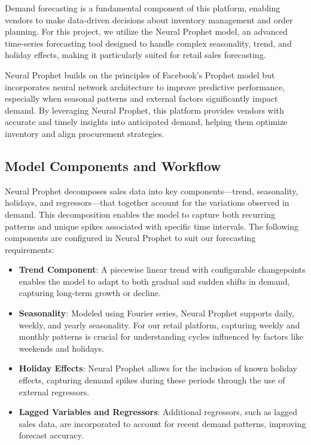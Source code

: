 Demand forecasting is a fundamental component of this platform, enabling vendors to make data-driven decisions about inventory management and order planning. For this project, we utilize the Neural Prophet model, an advanced time-series forecasting tool designed to handle complex seasonality, trend, and holiday effects, making it particularly suited for retail sales forecasting.

Neural Prophet builds on the principles of Facebook's Prophet model but incorporates neural network architecture to improve predictive performance, especially when seasonal patterns and external factors significantly impact demand. By leveraging Neural Prophet, this platform provides vendors with accurate and timely insights into anticipated demand, helping them optimize inventory and align procurement strategies.

\subsection{Model Components and Workflow}

Neural Prophet decomposes sales data into key components—trend, seasonality, holidays, and regressors—that together account for the variations observed in demand. This decomposition enables the model to capture both recurring patterns and unique spikes associated with specific time intervals. The following components are configured in Neural Prophet to suit our forecasting requirements:

\begin{itemize}
    \item \textbf{Trend Component}: A piecewise linear trend with configurable changepoints enables the model to adapt to both gradual and sudden shifts in demand, capturing long-term growth or decline.
    
    \item \textbf{Seasonality}: Modeled using Fourier series, Neural Prophet supports daily, weekly, and yearly seasonality. For our retail platform, capturing weekly and monthly patterns is crucial for understanding cycles influenced by factors like weekends and holidays.
    
    \item \textbf{Holiday Effects}: Neural Prophet allows for the inclusion of known holiday effects, capturing demand spikes during these periods through the use of external regressors.
    
    \item \textbf{Lagged Variables and Regressors}: Additional regressors, such as lagged sales data, are incorporated to account for recent demand patterns, improving forecast accuracy.
\end{itemize}

